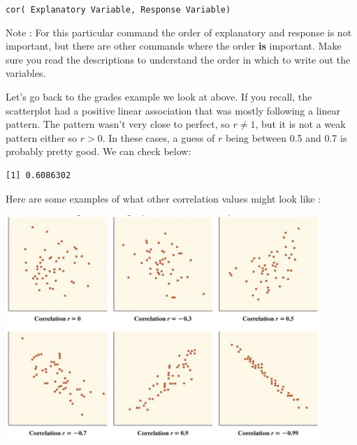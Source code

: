 \documentclass[
  letterpaper,
  DIV=11,
  numbers=noendperiod]{scrreprt}
\newenvironment{Shaded}{\begin{snugshade}}{\end{snugshade}}
\newcommand{\CommentTok}[1]{\textcolor[rgb]{0.37,0.37,0.37}{#1}}
\newcommand{\FunctionTok}[1]{\textcolor[rgb]{0.28,0.35,0.67}{#1}}
\newcommand{\NormalTok}[1]{\textcolor[rgb]{0.00,0.23,0.31}{#1}}
\newcommand{\OtherTok}[1]{\textcolor[rgb]{0.00,0.23,0.31}{#1}}
\newcommand{\SpecialCharTok}[1]{\textcolor[rgb]{0.37,0.37,0.37}{#1}}
\begin{document}
\texttt{cor(\ Explanatory\ Variable,\ Response\ Variable)}

Note : For this particular command the order of explanatory and response
is not important, but there are other commands where the order
\textbf{is} important. Make sure you read the descriptions to understand
the order in which to write out the variables.

Let's go back to the grades example we look at above. If you recall, the
scatterplot had a positive linear association that was mostly following
a linear pattern. The pattern wasn't very close to perfect, so
\(r \neq 1\), but it is not a weak pattern either so \(r > 0\). In these
cases, a guess of \(r\) being between 0.5 and 0.7 is probably pretty
good. We can check below:

\begin{Shaded}
\end{Shaded}

\begin{verbatim}
[1] 0.6086302
\end{verbatim}

Here are some examples of what other correlation values might look like
:

\includegraphics[width=0.9\textwidth,height=\textheight]{./images/SC_8.jpg}
\end{document}
